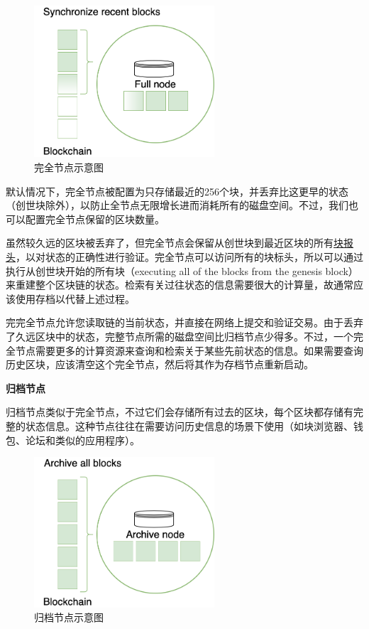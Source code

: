 \begin{figure}[htbp]
  \centering
  \includegraphics[width=0.6\textwidth]{images/full-node.png}
  \caption{完全节点示意图}\label{完全节点示意图} %
\end{figure}

默认情况下，完全节点被配置为只存储最近的256个块，并丢弃比这更早的状态（创世块除外），以防止全节点无限增长进而消耗所有的磁盘空间。不过，我们也可以配置完全节点保留的区块数量。

虽然较久远的区块被丢弃了，但完全节点会保留从创世块到最近区块的所有\href{/reference/glossary/\#header}{块报头}，以对状态的正确性进行验证。完全节点可以访问所有的块标头，所以可以通过执行从创世块开始的所有块（executing
all of the blocks from the genesis
block）来重建整个区块链的状态。检索有关过往状态的信息需要很大的计算量，故通常应该使用存档以代替上述过程。

完完全节点允许您读取链的当前状态，并直接在网络上提交和验证交易。由于丢弃了久远区块中的状态，完整节点所需的磁盘空间比归档节点少得多。不过，一个完全节点需要更多的计算资源来查询和检索关于某些先前状态的信息。如果需要查询历史区块，应该清空这个完全节点，然后将其作为存档节点重新启动。

\hypertarget{ux5f52ux6863ux8282ux70b9}{%
\textbf{归档节点}\label{ux5f52ux6863ux8282ux70b9}}

归档节点类似于完全节点，不过它们会存储所有过去的区块，每个区块都存储有完整的状态信息。这种节点往往在需要访问历史信息的场景下使用（如块浏览器、钱包、论坛和类似的应用程序）。

\begin{figure}[htbp]
  \centering
  \includegraphics[width=0.6\textwidth]{images/archive-node.png}
  \caption{归档节点示意图}\label{归档节点示意图} %
\end{figure}

